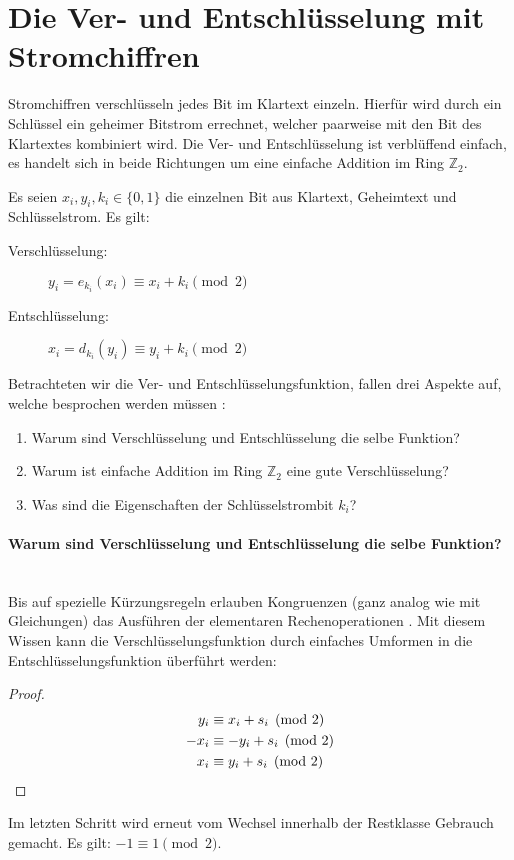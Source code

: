 \section{Die Ver- und Entschlüsselung mit Stromchiffren}
Stromchiffren verschlüsseln jedes Bit im Klartext einzeln. Hierfür
wird durch ein Schlüs\-sel ein geheimer Bitstrom errechnet, welcher paarweise mit den Bit
des Klartextes kombiniert wird. Die Ver- und Entschlüsselung ist verblüffend einfach, es handelt
sich in beide Richtungen um eine einfache Addition im Ring $\mathbb{Z}_2$.

\begin{definition}
  Es seien $x_i,y_i,k_i \in \{0,1\}$ die einzelnen Bit aus Klartext, Geheimtext und Schlüs\-selstrom.
  Es gilt:
  \begin{description}
    \item[Verschlüsselung:] $y_i = e_{k_i}(x_i) \equiv x_i + k_i \pmod{2}$
    \item[Entschlüsselung:] $x_i = d_{k_i}(y_i) \equiv y_i + k_i \pmod{2}$
  \end{description}
\end{definition}

\noindent
Betrachteten wir die Ver- und Entschlüsselungsfunktion, fallen drei Aspekte auf, welche
besprochen werden müssen \parencite[31-34]{BOOK:crypto}:

\begin{enumerate}
  \item Warum sind Verschlüsselung und Entschlüsselung die selbe Funktion?
  \item Warum ist einfache Addition im Ring $\mathbb{Z}_2$ eine gute Verschlüsselung?
  \item Was sind die Eigenschaften der Schlüsselstrombit $k_i$?
\end{enumerate}

\paragraph{Warum sind Verschlüsselung und Entschlüsselung die selbe Funktion?}\mbox{}\\
Bis auf spezielle Kürzungsregeln erlauben Kongruenzen (ganz analog wie mit Gleichungen)
das Ausführen der elementaren Rechenoperationen \parencite[181-183]{BOOK:numberTheory}.
Mit diesem Wissen kann die Verschlüsselungsfunktion durch einfaches Umformen in die
Entschlüsselungsfunktion überführt werden:
\begin{proof}
  \begin{align*}
    y_i  & \equiv x_i + s_i \pmod{2}          \\
    -x_i & \equiv -y_i + s_i \pmod{2}         \\
    x_i  & \equiv y_i + s_i \pmod{2} \qedhere
  \end{align*}
\end{proof}
\noindent
Im letzten Schritt wird erneut vom Wechsel innerhalb der Restklasse Gebrauch gemacht.
Es gilt: $-1 \equiv 1 \pmod{2}$.

